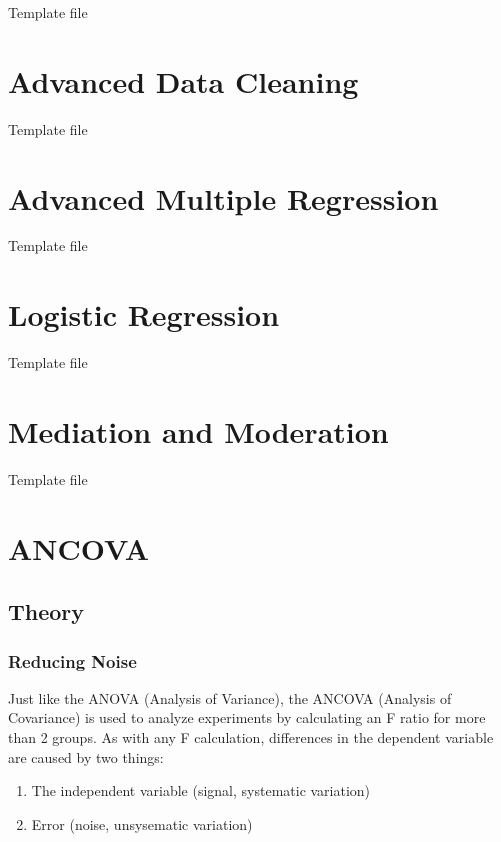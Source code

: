 \documentclass[]{book}
\providecommand{\tightlist}{%
  \setlength{\itemsep}{0pt}\setlength{\parskip}{0pt}}
\theoremstyle{definition}
\theoremstyle{definition}
\theoremstyle{definition}
\theoremstyle{remark}
\begin{document}
Template file

\chapter{Advanced Data Cleaning}\label{advanced-data-cleaning}

Template file

\chapter{Advanced Multiple
Regression}\label{advanced-multiple-regression}

Template file

\chapter{Logistic Regression}\label{logistic-regression}

Template file

\chapter{Mediation and Moderation}\label{mediation-and-moderation}

Template file

\chapter{ANCOVA}\label{ancova}

\section{Theory}\label{theory}

\subsection{Reducing Noise}\label{reducing-noise}

Just like the ANOVA (Analysis of Variance), the ANCOVA (Analysis of
Covariance) is used to analyze experiments by calculating an F ratio for
more than 2 groups. As with any F calculation, differences in the
dependent variable are caused by two things:

\begin{enumerate}
\def\labelenumi{\arabic{enumi}.}
\tightlist
\item
  The independent variable (signal, systematic variation)
\item
  Error (noise, unsysematic variation)
\end{enumerate}
\end{document}
